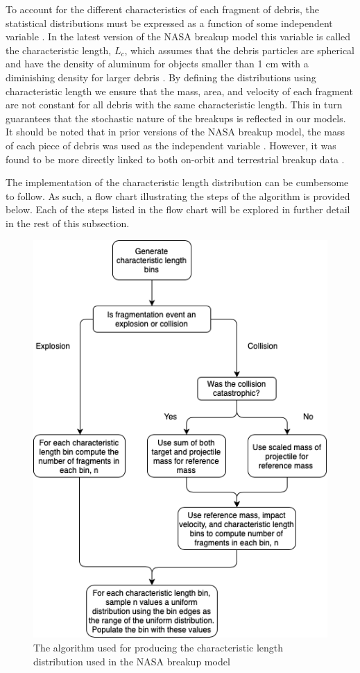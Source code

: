 \documentclass[a4paper, 12pt]{article}
\begin{document}
To account for the different characteristics of each fragment of debris, the statistical distributions must be expressed as a function of some independent variable \citep{johnson_nasas_2001}. In the latest version of the NASA breakup model this variable is called the characteristic length, $L_c$, which assumes that the debris particles are spherical and have the density of aluminum for objects smaller than 1 cm with a diminishing density for larger debris \citep{johnson_nasas_2001}. By defining the distributions using characteristic length we ensure that the mass, area, and velocity of each fragment are not constant for all debris with the same characteristic length. This in turn guarantees that the stochastic nature of the breakups is reflected in our models. It should be noted that in prior versions of the NASA breakup model, the mass of each piece of debris was used as the independent variable \citep{krisko_proper_2011}. However, it was found to be more directly linked to both on-orbit and terrestrial breakup data \citep{johnson_nasas_2001}.

The implementation of the characteristic length distribution can be cumbersome to follow. As such, a flow chart illustrating the steps of the algorithm is provided below. Each of the steps listed in the flow chart will be explored in further detail in the rest of this subsection.

\begin{figure}[H]
	\centering
	\includegraphics[scale=0.5, trim=0cm 0cm 0cm 5cm]{L_c_flow}
	\caption{The algorithm used for producing the characteristic length distribution used in the NASA breakup model}
\end{figure}
\end{document}
